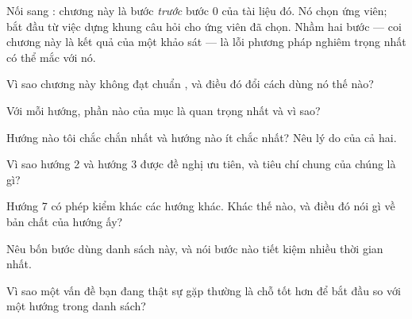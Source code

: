\documentclass[../../vslam.tex]{subfiles}
\begin{document}
Nối sang : chương này là bước \emph{trước} bước 0 của tài liệu đó. Nó chọn ứng viên;  bắt đầu từ việc dựng khung câu hỏi cho ứng viên đã chọn. Nhầm hai bước --- coi chương này là kết quả của một khảo sát --- là lỗi phương pháp nghiêm trọng nhất có thể mắc với nó.

\begin{tukiem}
\item Vì sao chương này không đạt chuẩn , và điều đó đổi cách dùng nó thế nào?
\item Với mỗi hướng, phần nào của mục là quan trọng nhất và vì sao?
\item Hướng nào tôi chắc chắn nhất và hướng nào ít chắc nhất? Nêu lý do của cả hai.
\item Vì sao hướng 2 và hướng 3 được đề nghị ưu tiên, và tiêu chí chung của chúng là gì?
\item Hướng 7 có phép kiểm khác các hướng khác. Khác thế nào, và điều đó nói gì về bản chất của hướng ấy?
\item Nêu bốn bước dùng danh sách này, và nói bước nào tiết kiệm nhiều thời gian nhất.
\item Vì sao một vấn đề bạn đang thật sự gặp thường là chỗ tốt hơn để bắt đầu so với một hướng trong danh sách?
\end{tukiem}
\ifSubfilesClassLoaded{\printbibliography[title={Nguồn}]}{}
\end{document}
